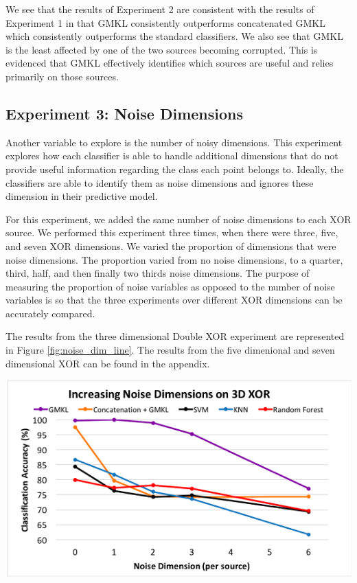 \documentclass{article}
\begin{document}
We see that the results of Experiment 2 are consistent with the results of Experiment 1 in that GMKL consistently outperforms concatenated GMKL which consistently outperforms the standard classifiers. We also see that GMKL is the least affected by one of the two sources becoming corrupted. This is evidenced that GMKL effectively identifies which sources are useful and relies primarily on those sources.



\subsection*{Experiment 3: Noise Dimensions}

Another variable to explore is the number of noisy dimensions. This experiment explores how each classifier is able to handle additional dimensions that do not provide useful information regarding the class each point belongs to. Ideally, the classifiers are able to identify them as noise dimensions and ignores these dimension in their predictive model.

For this experiment, we added the same number of noise dimensions to each XOR source. We performed this experiment three times, when there were three, five, and seven XOR dimensions. We varied the proportion of dimensions that were noise dimensions. The proportion varied from no noise dimensions, to a quarter, third, half, and then finally two thirds noise dimensions. The purpose of measuring the proportion of noise variables as opposed to the number of noise variables is so that the three experiments over different XOR dimensions can be accurately compared.

The results from the three dimensional Double XOR experiment are represented in Figure \ref{fig:noise_dim_line}. The results from the five dimenional and seven dimensional XOR can be found in the appendix.

\begin{minipage}{\textwidth}
    \centering
    \includegraphics[scale=0.7]{Noise_Dim_line.png}
    \label{fig:noise_dim_line}
\end{minipage}
\end{document}
